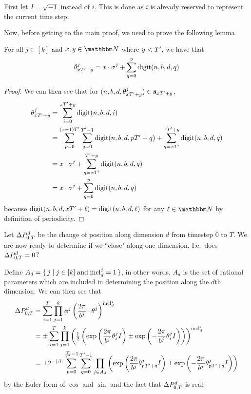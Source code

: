 First let $I = \sqrt{-1}$ instead of $i$. This is done as $i$ is already reserved
to represent the current time step.

Now, before getting to the main proof, we need to prove the following lemma
\begin{lemma}{For all $j \in [k]$ and $x, y \in \N$ where $y < {T}'$, we have that 
  $$
    \theta_{xT' + y}^j = x\cdot \sigma^j + \sum_{q = 0}^y \mathrm{digit}(n, b, d, q)
  $$}
  \label{lemma:angleBreakdown}
  \begin{proof}
    We can then see that for $(n, b, d, \theta_{x{T}' + y}^j) \in \pmb{s}_{x{T}' + y}$,
    \begin{align*}
      {\theta^j_{x {T}'+ y}} &= \sum_{i = 0}^{x {T}' + y} \mathrm{digit}(n, b, d, i) \\
      &= \sum_{p = 0}^{(x- 1){T}'} \sum_{q=0}^{{T}' - 1} \mathrm{digit}(n, b, d, p{T}' + q)
          + \sum_{q = x {T}'}^{x {T}' + y} \mathrm{digit}(n, b, d, q)\\
      &= x \cdot \sigma^j + \sum_{q = x {T}'}^{{T}' + y}\mathrm{digit}(n, b, d, q)\\
      &= x \cdot \sigma^j + \sum_{q = 0}^{y}\mathrm{digit}(n, b, d, q)
    \end{align*}
    because $\mathrm{digit}(n, b, d, x{T}' + \ell) = \mathrm{digit}(n, b, d, \ell)$ for any $\ell \in \N$
    by definition of periodicity.
  \end{proof}
\end{lemma}

Let $\Delta P_{0, T}^d$ be the change of position along dimension $d$
from timestep 0 to $T$.
We are now ready to determine if we ``close" along one dimension. I.e.\ does
$
\Delta P_{0, T}^d = 0
$?

Define $A_d = \set{j \mid j \in [k] \; \text{and}\; {\mathrm{incl}_{d}^{j}} = 1}$, in other words,
$A_d$ is the set of rational parameters which are included in determining the position along the $d$th dimension.
We can then see that
\begin{align*}
\Delta P_{0, T}^d &=\sum_{i = 1}^T \prod_{j=1}^k \phi^j\left(\frac{2\pi}{b^j} \cdot \theta^j\right) ^ {{\mathrm{incl}_{d}^{j}}}\\
  &=\pm\sum_{i = 1}^T \prod_{j = 1}^k \left(\tfrac{1}{2} \left(\exp\left({\frac{2\pi}{b^j} {\theta^j_{i}} I}\right) \pm \exp\left(-\frac{2\pi}{b^j} {\theta^j_{i}} I\right)\right)\right)^{\mathrm{incl}_{d}^{j}}\\
  &= \pm 2^{-|A|} \sum_{p= 0}^{\frac{T}{{T}'} - 1} \sum_{q = 0}^{{T}' - 1}
    \prod_{j \in A_d} \left(
      \exp\left(\frac{2\pi}{b^j}{\theta^j_{p {T}' + q}} I\right) \pm  \exp\left(-\frac{2\pi}{b^j}{\theta^j_{p {T}' + q}} I\right)\right)
\end{align*}
by the Euler form of $\cos$ and $\sin$ and the fact that $\Delta P_{0, T}^d$ is real.

